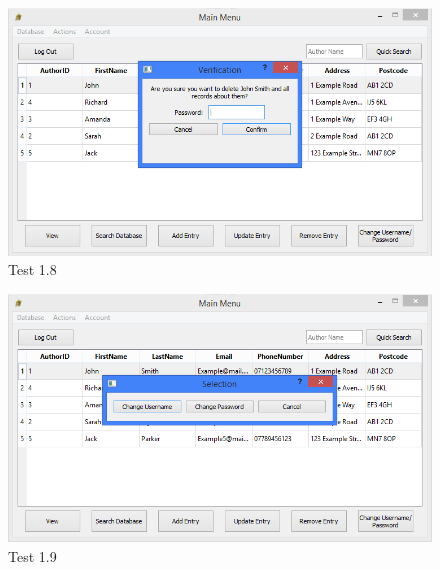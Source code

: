 \begin{landscape}
\begin{figure}[H]
    \includegraphics[width=\textwidth]{./Testing/Evidence/RemoveEntryButtonTest.png}
    \caption{Test 1.8}  \label{fig:RemoveEntryButtonTest}
\end{figure}

\begin{figure}[H]
    \includegraphics[width=\textwidth]{./Testing/Evidence/ChangeButtonTest.png}
    \caption{Test 1.9}  \label{fig:ChangeButtonTest}
\end{figure}


\end{landscape}
